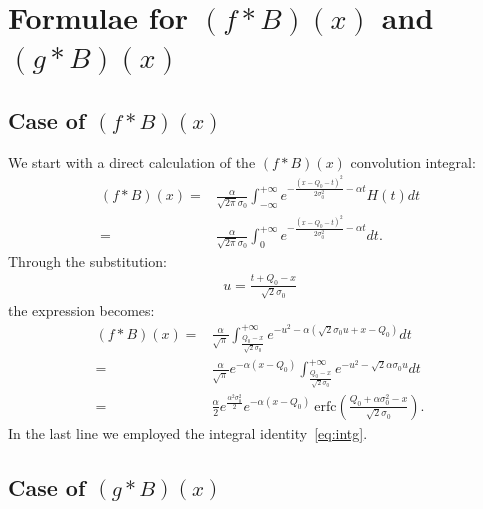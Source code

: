 \documentclass[preprint,12pt]{elsarticle}
\begin{document}
\section{Formulae for $(f*B)(x)$ and $(g*B)(x)$}
\label{app:sr1}
%

\subsection*{Case of $(f*B)(x)$ }
%

We start with a direct calculation of the $(f*B)(x)$ convolution integral:
\begin{align}
(f*B)(x) = & \frac{\alpha}{\sqrt{2\pi}\sigma_0}   \int^{+\infty}_{-\infty} e^{ -\frac{(x-Q_0-t)^2}{2\sigma_0^2} -\alpha t } H(t) dt \nonumber \\
             = & \frac{\alpha}{\sqrt{2\pi}\sigma_0}  \int^{+\infty}_{0} e^{ -\frac{(x-Q_0-t)^2}{2\sigma_0^2} -\alpha t } dt.
\end{align}
Through the substitution:
\begin{align}
u = \frac{t+Q_0-x}{\sqrt{2}\sigma_0}  
\end{align}
the expression becomes:
\begin{align}
(f*B)(x) = & \frac{\alpha }{\sqrt{\pi}}   \int^{+\infty}_{ \frac{Q_0-x}{\sqrt{2}\sigma_0}   } e^{ -u^2 -\alpha( \sqrt{2}\sigma_0 u + x - Q_0 ) } dt \nonumber \\
            = & \frac{\alpha }{\sqrt{\pi}} e^{-\alpha(x-Q_0)} \int^{+\infty}_{ \frac{Q_0-x}{\sqrt{2}\sigma_0}   } e^{ -u^2 - \sqrt{2}\alpha\sigma_0 u  } dt  \nonumber \\
            = & \frac{\alpha }{2} e^{\frac{\alpha^2\sigma_0^2}{2}} e^{-\alpha(x-Q_0)} \ \text{erfc}\left(    \frac{Q_0 + \alpha\sigma_0^2 -x }{\sqrt{2}\sigma_0} \right).
\end{align}
In the last line we employed the integral identity~\eqref{eq:intg}. 


\subsection*{Case of $(g*B)(x)$ }
%
\end{document}
